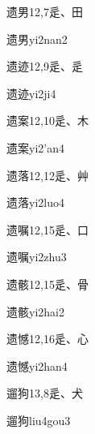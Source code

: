 \begin{entry}{遗男}{12,7}{⾡、⽥}
  \begin{phonetics}{遗男}{yi2nan2}
  \end{phonetics}
\end{entry}

\begin{entry}{遗迹}{12,9}{⾡、⾡}
  \begin{phonetics}{遗迹}{yi2ji4}
  \end{phonetics}
\end{entry}

\begin{entry}{遗案}{12,10}{⾡、⽊}
  \begin{phonetics}{遗案}{yi2'an4}
  \end{phonetics}
\end{entry}

\begin{entry}{遗落}{12,12}{⾡、⾋}
  \begin{phonetics}{遗落}{yi2luo4}
  \end{phonetics}
\end{entry}

\begin{entry}{遗嘱}{12,15}{⾡、⼝}
  \begin{phonetics}{遗嘱}{yi2zhu3}
  \end{phonetics}
\end{entry}

\begin{entry}{遗骸}{12,15}{⾡、⾻}
  \begin{phonetics}{遗骸}{yi2hai2}
  \end{phonetics}
\end{entry}

\begin{entry}{遗憾}{12,16}{⾡、⼼}
  \begin{phonetics}{遗憾}{yi2han4}
  \end{phonetics}
\end{entry}

\begin{entry}{遛狗}{13,8}{⾡、⽝}
  \begin{phonetics}{遛狗}{liu4gou3}
  \end{phonetics}
\end{entry}

